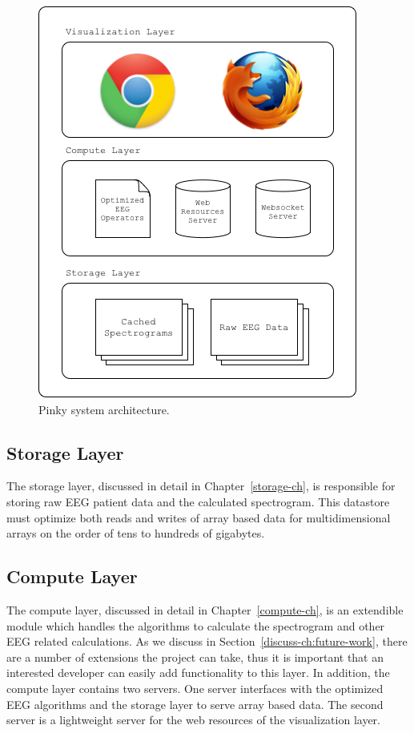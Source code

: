 \begin{figure}[h]
\begin{center}
\includegraphics[scale=0.75]{./img/system-architecture.png}
\caption{Pinky system architecture.}
\label{fig:system-architecture}
\end{center}
\end{figure}

\subsection{Storage Layer}

The storage layer, discussed in detail in Chapter~\ref{storage-ch}, is
responsible for storing raw EEG patient data and the calculated spectrogram.
This datastore must optimize both reads and writes of array based data for
multidimensional arrays on the order of tens to hundreds of gigabytes.

\subsection{Compute Layer}

The compute layer, discussed in detail in Chapter~\ref{compute-ch}, is an
extendible module which handles the algorithms to calculate the spectrogram and
other EEG related calculations. As we discuss in
Section~\ref{discuss-ch:future-work}, there are a number of extensions the
project can take, thus it is important that an interested developer can easily
add functionality to this layer. In addition, the compute layer contains two
servers. One server interfaces with the optimized EEG algorithms and the
storage layer to serve array based data. The second server is a lightweight
server for the web resources of the visualization layer.

